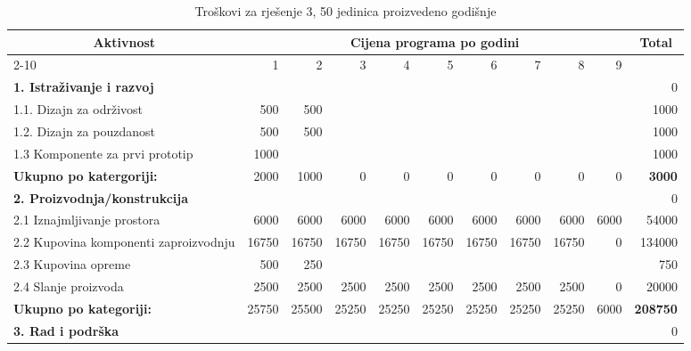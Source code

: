 \documentclass[12pt]{article}
\begin{document}
\begin{landscape}
\begin{table}[htbp]
  \centering
  \small
  \caption{Troškovi za rješenje 3, 50 jedinica proizvedeno godišnje}
    \begin{tabular}{lrrrrrrrrrr}
    \toprule
    \multicolumn{1}{c}{\multirow{2}[4]{*}{Aktivnost}} & \multicolumn{9}{c}{Cijena programa po godini}                         & \multicolumn{1}{c}{\multirow{2}[4]{*}{Total}} \\
\cmidrule{2-10}          & 1     & 2     & 3     & 4     & 5     & 6     & 7     & 8     & 9     &  \\
    \midrule
    \textbf{1. Istraživanje i razvoj} &       &       &       &       &       &       &       &       &       & 0 \\
    1.1. Dizajn za održivost & 500   & 500   &       &       &       &       &       &       &       & 1000 \\
    1.2. Dizajn za pouzdanost & 500   & 500   &       &       &       &       &       &       &       & 1000 \\
    1.3 Komponente za prvi prototip & 1000  &       &       &       &       &       &       &       &       & 1000 \\
    \midrule
    \textbf{Ukupno po katergoriji:} & 2000  & 1000  & 0     & 0     & 0     & 0     & 0     & 0     & 0     & \textbf{3000} \\
    \midrule
    \textbf{2. Proizvodnja/konstrukcija} &       &       &       &       &       &       &       &       &       & 0 \\
    2.1 Iznajmljivanje prostora & 6000  & 6000  & 6000  & 6000  & 6000  & 6000  & 6000  & 6000  & 6000  & 54000 \\
    \multicolumn{1}{p{14.715em}}{2.2 Kupovina komponenti za\newline{}proizvodnju} & 16750 & 16750 & 16750 & 16750 & 16750 & 16750 & 16750 & 16750 & 0     & 134000 \\
    2.3 Kupovina opreme & 500   & 250   &       &       &       &       &       &       &       & 750 \\
    2.4 Slanje proizvoda & 2500  & 2500  & 2500  & 2500  & 2500  & 2500  & 2500  & 2500  & 0     & 20000 \\
    \midrule
    \textbf{Ukupno po kategoriji:} & 25750 & 25500 & 25250 & 25250 & 25250 & 25250 & 25250 & 25250 & 6000  & \textbf{208750} \\
    \midrule
    \textbf{3. Rad i podrška} &       &       &       &       &       &       &       &       &       & 0 \\

\end{tabular}
\end{table}
\end{landscape}
\end{document}

